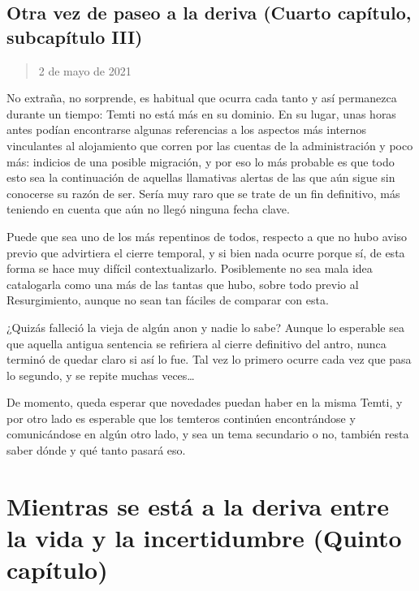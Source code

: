 \documentclass[
  spanish,
]{book}
\begin{document}
\hypertarget{otra-vez-de-paseo-a-la-deriva-cuarto-capuxedtulo-subcapuxedtulo-iii}{%
\section{Otra vez de paseo a la deriva (Cuarto capítulo, subcapítulo III)}\label{otra-vez-de-paseo-a-la-deriva-cuarto-capuxedtulo-subcapuxedtulo-iii}}

\begin{quote}
2 de mayo de 2021
\end{quote}

No extraña, no sorprende, es habitual que ocurra cada tanto y así permanezca durante un tiempo: Temti no está más en su dominio. En su lugar, unas horas antes podían encontrarse algunas referencias a los aspectos más internos vinculantes al alojamiento que corren por las cuentas de la administración y poco más: indicios de una posible migración, y por eso lo más probable es que todo esto sea la continuación de aquellas llamativas alertas de las que aún sigue sin conocerse su razón de ser. Sería muy raro que se trate de un fin definitivo, más teniendo en cuenta que aún no llegó ninguna fecha clave.

Puede que sea uno de los más repentinos de todos, respecto a que no hubo aviso previo que advirtiera el cierre temporal, y si bien nada ocurre porque sí, de esta forma se hace muy difícil contextualizarlo. Posiblemente no sea mala idea catalogarla como una más de las tantas que hubo, sobre todo previo al Resurgimiento, aunque no sean tan fáciles de comparar con esta.

¿Quizás falleció la vieja de algún anon y nadie lo sabe? Aunque lo esperable sea que aquella antigua sentencia se refiriera al cierre definitivo del antro, nunca terminó de quedar claro si así lo fue. Tal vez lo primero ocurre cada vez que pasa lo segundo, y se repite muchas veces\ldots{}

De momento, queda esperar que novedades puedan haber en la misma Temti, y por otro lado es esperable que los temteros continúen encontrándose y comunicándose en algún otro lado, y sea un tema secundario o no, también resta saber dónde y qué tanto pasará eso.

\hypertarget{mientras-se-estuxe1-a-la-deriva-entre-la-vida-y-la-incertidumbre-quinto-capuxedtulo}{%
\chapter{Mientras se está a la deriva entre la vida y la incertidumbre (Quinto capítulo)}\label{mientras-se-estuxe1-a-la-deriva-entre-la-vida-y-la-incertidumbre-quinto-capuxedtulo}}
\end{document}
